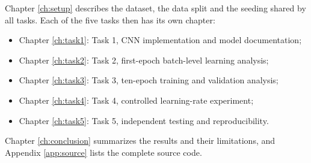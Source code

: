 Chapter \ref{ch:setup} describes the dataset, the data split and the
seeding shared by all tasks. Each of the five tasks then has its own
chapter:

\begin{itemize}
  \item Chapter \ref{ch:task1}: Task 1, CNN implementation and model
        documentation;
  \item Chapter \ref{ch:task2}: Task 2, first-epoch batch-level learning
        analysis;
  \item Chapter \ref{ch:task3}: Task 3, ten-epoch training and validation
        analysis;
  \item Chapter \ref{ch:task4}: Task 4, controlled learning-rate
        experiment;
  \item Chapter \ref{ch:task5}: Task 5, independent testing and
        reproducibility.
\end{itemize}

Chapter \ref{ch:conclusion} summarizes the results and their
limitations, and Appendix \ref{app:source} lists the complete source
code.
